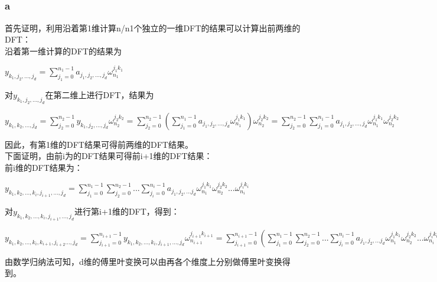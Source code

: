 \documentclass[UTF8]{ctexart}
\begin{document}
\subsection{}
\subsubsection{a}
首先证明，利用沿着第1维计算n/n1个独立的一维DFT的结果可以计算出前两维的DFT：\\
沿着第一维计算的DFT的结果为
\begin{center}
$y_{k_1,j_2,...,j_d}=\sum\limits_{j_1=0}^{n_1-1}a_{j_1,j_2,...,j_d}\omega^{j_1k_1}_{n_1}$
\end{center}
对$y_{k_1,j_2,...,j_d}$在第二维上进行DFT，结果为
\begin{center}
$y_{k_1,k_2,...,j_d}=\sum\limits_{j_2=0}^{n_2-1}y_{k_1,j_2,...,j_d}\omega^{j_2k_2}_{n_2}=\sum\limits_{j_2=0}^{n_2-1}(\sum\limits_{j_1=0}^{n_1-1}a_{j_1,j_2,...,j_d}\omega^{j_1k_1}_{n_1})\omega^{j_2k_2}_{n_2}=\sum\limits_{j_2=0}^{n_2-1}\sum\limits_{j_1=0}^{n_1-1}a_{j_1,j_2,...,j_d}\omega^{j_1k_1}_{n_1}\omega^{j_2k_2}_{n_2}$
\end{center}
因此，有第1维的DFT结果可得前两维的DFT结果。\\
下面证明，由前i为的DFT结果可得前i+1维的DFT结果：\\
前i维的DFT结果为：\\
\begin{center}
$y_{k_1,k_2,...,k_i,j_{i+1},...,j_d}=\sum\limits_{j_1=0}^{n_1-1}\sum\limits_{j_2=0}^{n_2-1}...\sum\limits_{j_i=0}^{n_i-1}a_{j_1,j_2,...j_d}\omega^{j_1k_1}_{n_1}\omega^{j_2k_2}_{n_2}...\omega^{j_ik_i}_{n_i}$
\end{center}
对$y_{k_1,k_2,...,k_i,j_{i+1},...,j_d}$进行第i+1维的DFT，得到：\\
\begin{center}
$y_{k_1,k_2,...,k_i,k_{i+1},j_{i+2}...,j_d}=\sum\limits_{j_{i+1}=0}^{n_{i+1}-1}y_{k_1,k_2,...,k_i,j_{i+1},...,j_d}\omega^{j_{i+1}k_{i+1}}_{n_{i+1}}=\sum\limits_{j_{i+1}=0}^{n_{i+1}-1}(\sum\limits_{j_1=0}^{n_1-1}\sum\limits_{j_2=0}^{n_2-1}...\sum\limits_{j_i=0}^{n_i-1}a_{j_1,j_2,...j_d}\omega^{j_1k_1}_{n_1}\omega^{j_2k_2}_{n_2}...\omega^{j_ik_i}_{n_i})\omega^{j_{i+1}k_{i+1}}_{n_{i+1}}=\sum\limits_{j_{1}=0}^{n_{1}-1}\sum\limits_{j_2=0}^{n_2-1}...\sum\limits_{j_i=0}^{n_i-1}\sum\limits_{j_{i+1}=0}^{n_{i+1}-1}a_{j_1,j_2,...j_d}\omega^{j_1k_1}_{n_1}\omega^{j_2k_2}_{n_2}...\omega^{j_ik_i}_{n_i}\omega^{j_{i+1}k_{i+1}}_{n_{i+1}}$
\end{center}
由数学归纳法可知，d维的傅里叶变换可以由再各个维度上分别做傅里叶变换得到。
\end{document}
